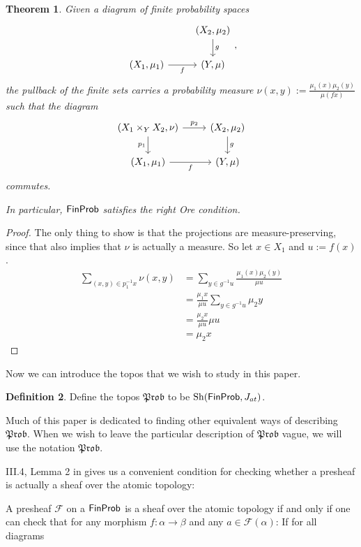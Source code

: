 \documentclass[a4paper]{amsproc}
\theoremstyle{plain}
\newtheorem{theorem}{Theorem}[section]
\theoremstyle{definition}
\newtheorem{definition}[theorem]{Definition}
\theoremstyle{remark}
\numberwithin{equation}{section}
\DeclareMathOperator{\Sh}{Sh}
\newcommand{\FinProb}{\textup{\textsf{FinProb}}}
\newcommand{\Prob}{\mathfrak{Prob}}
\begin{document}
\begin{theorem} \label{pullback_measure}
Given a diagram of finite probability spaces
\[
\begin{tikzcd}
                               & {(X_2,\mu_2)} \arrow[d, "g"] \\
{(X_1, \mu_1)} \arrow[r, "f"'] & {(Y,\mu)}
\end{tikzcd},
\]
the pullback of the finite sets carries a probability measure $\nu(x,y) := \frac{\mu_1(x) \mu_2(y)}{\mu(f x)}$ such that the diagram
\[
\begin{tikzcd}
{(X_1 \times_Y X_2, \nu)} \arrow[d, "p_1"'] \arrow[r, "p_2"] & {(X_2,\mu_2)} \arrow[d, "g"] \\
{(X_1, \mu_1)} \arrow[r, "f"']                               & {(Y,\mu)}
\end{tikzcd}
\]
commutes.

In particular, $\FinProb$ satisfies the right Ore condition.
\end{theorem}
\begin{proof}
The only thing to show is that the projections are measure-preserving, since that also implies that $\nu$ is actually a measure. So let $x \in X_1$ and $u := f(x)$.
\begin{align*}
\sum_{(x,y) \in p_1^{-1} x} \nu(x,y) &= \sum_{y \in g^{-1} u} \frac{\mu_1(x)\mu_2(y)}{\mu u} \\
&= \frac{\mu_1 x}{\mu u} \sum_{y \in g^{-1} u} \mu_2 y \\
&= \frac{\mu_2 x}{\mu u} \mu u \\
&= \mu_2 x
\end{align*}
\end{proof}

Now we can introduce the topos that we wish to study in this paper.

\begin{definition}
Define the topos $\Prob$ to be $\Sh(\FinProb, J_{at})$.
\end{definition}

Much of this paper is dedicated to finding other equivalent ways of describing $\Prob$. When we wish to leave the particular description of $\Prob$ vague, we will use the notation $\Prob$.

III.4, Lemma 2 in \cite{sheaves_geometry_logic} gives us a convenient condition for checking whether a presheaf is actually a sheaf over the atomic topology:

A presheaf $\mathcal{F}$ on a $\FinProb$ is a sheaf over the atomic topology if and only if one can check that for any morphism $f: \alpha \to \beta$ and any $a \in \mathcal{F}(\alpha)$: If for all diagrams
\end{document}
